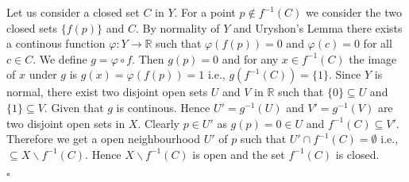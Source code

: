 \documentclass[11pt]{article}
\newcommand{\rbb}{\mathbb{R}}
\newcommand{\subs}{\subseteq}
\newcommand{\vphi}{\varphi}
\newenvironment{solution}[1][]{\smallskip \noindent {\textit{{Solution}.}\ }}{ \noindent \hfill $\square$  \medskip \vspace{1.5cm} \par}
\begin{document}
\begin{solution}
    Let us consider a closed set $C$ in $Y.$ For a point $p\notin f^{-1}(C)$ we consider the two closed sets $\{f(p)\}$ and $C$. By normality of $Y$ and Uryshon's Lemma there exists a continous function $\vphi:Y\to \rbb$ such that $\vphi(f(p))=0$ and $\vphi(c)=0$ for all $c\in C.$ We define $g=\vphi\circ f$. Then $g(p)=0$ and for any $x\in f^{-1}(C)$ the image of $x$ under $g$ is $g(x)=\vphi(f(p))=1$ i.e., $g(f^{-1}(C))=\{1\}.$ Since $Y$ is normal, there exist two disjoint open sets $U$ and $V$ in $\rbb$ such that $\{0\}\subs U$ and $\{1\}\subs V$. Given that $g$ is continous. Hence $U'=g^{-1}(U)$ and $V'=g^{-1}(V)$ are two disjoint open sets in $X$. Clearly $p\in U'$ as $g(p)=0\in U$ and $f^{-1}(C)\subs V'$. Therefore we get a open neighbourhood $U'$ of $p$ such that $U'\cap f^{-1}(C)=\emptyset$ i.e., $\subs X\smallsetminus f^{-1}(C) $. Hence $X\smallsetminus f^{-1}(C)$ is open and the set $f^{-1}(C)$ is closed.

    \begin{center}
    \end{center}
\end{solution}
\end{document}
